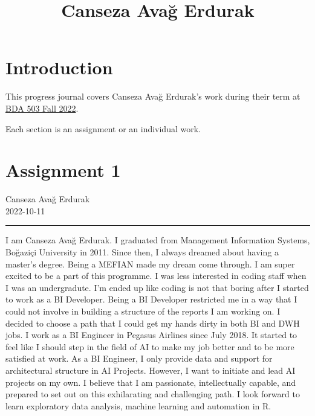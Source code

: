 \documentclass[
  letterpaper,
  DIV=11,
  numbers=noendperiod]{scrreprt}
\title{Canseza Avağ Erdurak}
\author{}
\date{}
\renewcommand*\contentsname{Table of contents}
\newcommand\contentsname{Table of contents}
\begin{document}
\maketitle
\ifdefined\Shaded\renewenvironment{Shaded}{\begin{tcolorbox}[boxrule=0pt, borderline west={3pt}{0pt}{shadecolor}, interior hidden, enhanced, sharp corners, breakable, frame hidden]}{\end{tcolorbox}}\fi

\renewcommand*\contentsname{Table of contents}
{
\hypersetup{linkcolor=}
\setcounter{tocdepth}{2}
\tableofcontents
}

\hypertarget{introduction}{%
\chapter*{Introduction}\label{introduction}}

This progress journal covers Canseza Avağ Erdurak's work during their
term at \href{https://mef-bda503.github.io/fall22/}{BDA 503 Fall 2022}.

Each section is an assignment or an individual work.


\hypertarget{assignment-1}{%
\chapter{Assignment 1}\label{assignment-1}}

Canseza Avağ Erdurak\\
2022-10-11

\hfill\break

\begin{center}\rule{0.5\linewidth}{0.5pt}\end{center}

I am Canseza Avağ Erdurak. I graduated from Management Information
Systems, Boğaziçi University in 2011. Since then, I always dreamed about
having a master's degree. Being a MEFIAN made my dream come through. I
am super excited to be a part of this programme. I was less interested
in coding staff when I was an undergradute. I'm ended up like coding is
not that boring after I started to work as a BI Developer. Being a BI
Developer restricted me in a way that I could not involve in building a
structure of the reports I am working on. I decided to choose a path
that I could get my hands dirty in both BI and DWH jobs. I work as a BI
Engineer in Pegasus Airlines since July 2018. It started to feel like I
should step in the field of AI to make my job better and to be more
satisfied at work. As a BI Engineer, I only provide data and support for
architectural structure in AI Projects. However, I want to initiate and
lead AI projects on my own. I believe that I am passionate,
intellectually capable, and prepared to set out on this exhilarating and
challenging path. I look forward to learn exploratory data analysis,
machine learning and automation in R.
\end{document}
